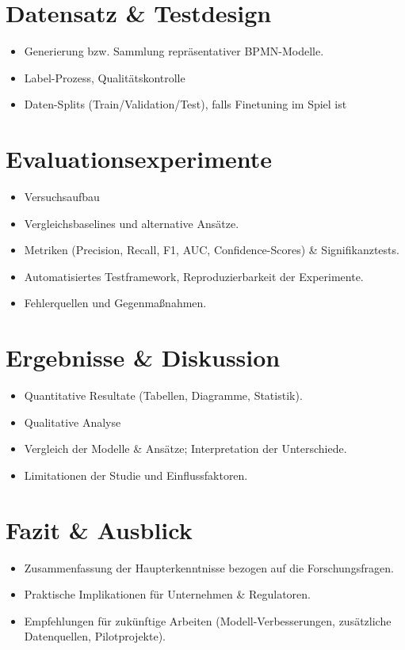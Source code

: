 \chapter{Datensatz \& Testdesign}\label{chap:data}
\begin{itemize}
    \item Generierung bzw. Sammlung repräsentativer BPMN-Modelle.
    \item Label-Prozess, Qualitätskontrolle
    \item Daten-Splits (Train/Validation/Test), falls Finetuning im Spiel ist
\end{itemize}

\chapter{Evaluationsexperimente}\label{chap:evaluation}
\begin{itemize}
    \item Versuchsaufbau
    \item Vergleichsbaselines und alternative Ansätze.
    \item Metriken (Precision, Recall, F1, AUC, Confidence-Scores) \& Signifikanztests.
    \item Automatisiertes Testframework, Reproduzierbarkeit der Experimente.
    \item Fehlerquellen und Gegenmaßnahmen.
\end{itemize}

\chapter{Ergebnisse \& Diskussion}\label{chap:results}
\begin{itemize}
    \item Quantitative Resultate (Tabellen, Diagramme, Statistik).
    \item Qualitative Analyse
    \item Vergleich der Modelle \& Ansätze; Interpretation der Unterschiede.
    \item Limitationen der Studie und Einflussfaktoren.
\end{itemize}

\chapter{Fazit \& Ausblick}\label{chap:conclusion}
\begin{itemize}
    \item Zusammenfassung der Haupterkenntnisse bezogen auf die Forschungsfragen.
    \item Praktische Implikationen für Unternehmen \& Regulatoren.
    \item Empfehlungen für zukünftige Arbeiten (Modell-Verbesserungen, zusätzliche Datenquellen, Pilotprojekte).
\end{itemize}